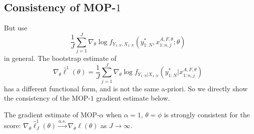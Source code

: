 \documentclass{article}
\begin{document}
\subsection{Consistency of MOP-$1$}

But \cite{poyiadjis11} use $$\frac{1}{J}\sum_{j=1}^J \nabla_\theta \log f_{Y_{1:N}, X_{1:N}}\left(y_{1:N}^* , x_{1:n,j}^{A, F,\theta}; \theta\right)$$ in general. The bootstrap estimate of $$\nabla_\theta \hat{\ell}^1(\theta) = \frac{1}{J}\sum_{j=1}^J \nabla_\theta \log f_{Y_{1:N}|X_{1:N}}\left(y_{1:N}^* | x_{1:n,j}^{A, F,\theta}\right)$$ has a different functional form, and is not the same a-priori. So we directly show the consistency of the MOP-$1$ gradient estimate below. 

\begin{thm}
        The gradient estimate of MOP-$\alpha$ when $\alpha=1$, $\theta=\phi$ is strongly consistent for the score: $\nabla_\theta \hat\ell_J^1(\theta) \stackrel{a.s.}{\to} \nabla_\theta \ell(\theta)$ as $J \to \infty$.
        \label{thm:mop-grad-consistency}
    \end{thm}
\end{document}
